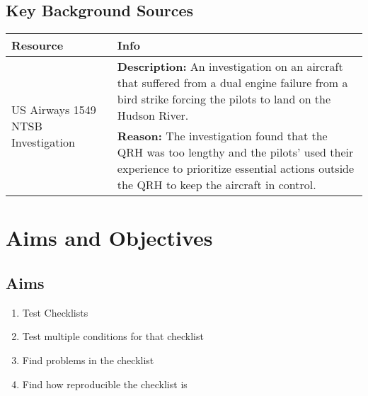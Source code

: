\documentclass[a4paper]{article}
\begin{document}
\subsection{Key Background Sources}
\begin{tabularx}{\linewidth}{p{8em} X}
    \toprule
    Resource & Info \\
    \midrule
    \multirow{2}{*}{\parbox{8em}{US Airways 1549 NTSB Investigation~\cite{AWE1549}}}
    & \textbf{Description:} An investigation on an aircraft that
        suffered from a dual engine failure from a bird strike
        forcing the pilots to land on the Hudson River. \\
    & \textbf{Reason:} The investigation found that the QRH was too
        lengthy and the pilots' used their experience to prioritize
        essential actions outside the QRH to keep the aircraft in control. \\
    \bottomrule
\end{tabularx}

\section{Aims and Objectives}
\subsection*{Aims}
\begin{enumerate}
    \item Test Checklists
    \item Test multiple conditions for that checklist
    \item Find problems in the checklist
    \item Find how reproducible the checklist is
\end{enumerate}
\end{document}
